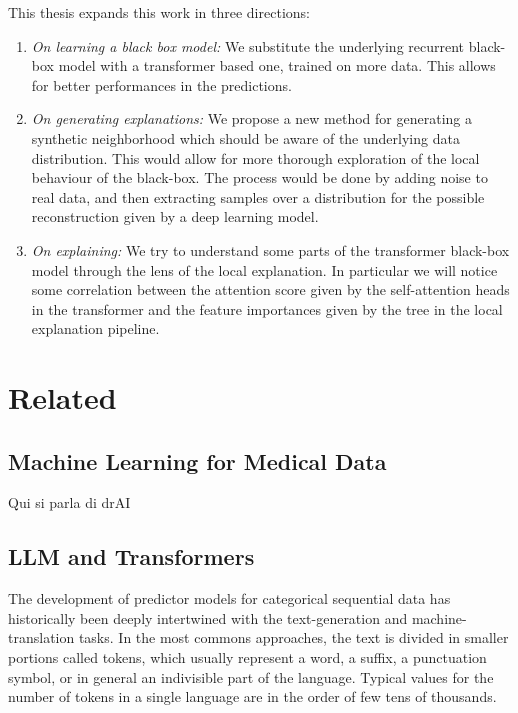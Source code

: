 \documentclass[]{marticle}
\begin{document}
This thesis expands this work in three directions:
\begin{enumerate}
\item \emph{On learning a black box model:} We substitute the underlying recurrent black-box model with a transformer based one, trained
on more data. This allows for better performances in the predictions.

\item \emph{On generating explanations:}  We propose a new method for generating a synthetic neighborhood which should be aware of the
underlying data distribution. This would allow for more thorough exploration of the local behaviour
of the black-box. The process would be done by adding noise to real data, and then extracting
samples over a distribution for the possible reconstruction given by a deep learning model.

\item \emph{On explaining:} We try to understand some parts of the transformer black-box model through the lens of the
local explanation. In particular we will notice some correlation between the attention score given
by the self-attention heads in the transformer and the feature importances given by the tree in the
local explanation pipeline.
\end{enumerate}

\section{Related}

\subsection{Machine Learning for Medical Data}

Qui si parla di drAI

\subsection{LLM and Transformers}

The development of predictor models for categorical sequential data has historically been deeply
intertwined with the text-generation and machine-translation tasks. In the most commons approaches,
the text is divided in smaller portions called tokens, which usually represent a word, a suffix, a
punctuation symbol, or in general an indivisible part of the language. Typical values for the number
of tokens in a single language are in the order of few tens of thousands.
\end{document}

